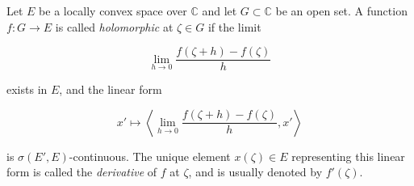 Let $E$ be a locally convex space over $\mathbb{C}$ and let $G \subset \mathbb{C}$ be an open set. A function $f: G \rightarrow E$ is called \emph{holomorphic} at $\zeta \in G$ if the limit

$$\lim_{h \to 0} \frac{f(\zeta + h) - f(\zeta)}{h}$$

exists in $E$, and the linear form

$$x' \mapsto \left\langle \lim_{h \to 0} \frac{f(\zeta + h) - f(\zeta)}{h}, x' \right\rangle$$

is $\sigma(E', E)$-continuous. The unique element $x(\zeta) \in E$ representing this linear form is called the \emph{derivative} of $f$ at $\zeta$, and is usually denoted by $f'(\zeta)$.

